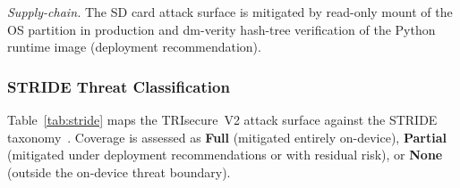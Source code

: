 \documentclass[pdflatex,sn-vancouver-num]{sn-jnl}%
\theoremstyle{thmstyleone}%
\theoremstyle{thmstyletwo}%
\theoremstyle{thmstylethree}%
\begin{document}
\textit{Supply-chain.} The SD card attack surface is mitigated by read-only
mount of the OS partition in production and dm-verity hash-tree verification of
the Python runtime image (deployment recommendation).

\subsubsection*{STRIDE Threat Classification}

Table~\ref{tab:stride} maps the TRIsecure~V2 attack surface against the
STRIDE taxonomy~\cite{shostack2014threat}. Coverage is assessed as
\textbf{Full} (mitigated entirely on-device), \textbf{Partial} (mitigated
under deployment recommendations or with residual risk), or \textbf{None}
(outside the on-device threat boundary).
\end{document}
